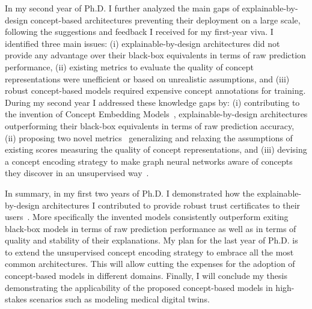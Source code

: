In my second year of Ph.D. I further analyzed the main gaps of explainable-by-design concept-based architectures preventing their deployment on a large scale, following the suggestions and feedback I received for my first-year viva. I identified three main issues: (i) explainable-by-design architectures did not provide any advantage over their black-box equivalents in terms of raw prediction performance, (ii) existing metrics to evaluate the quality of concept representations were unefficient or based on unrealistic assumptions, and (iii) robust concept-based models required expensive concept annotations for training. During my second year I addressed these knowledge gaps by: (i) contributing to the invention of Concept Embedding Models~\citep{zarlenga2022concept}, explainable-by-design architectures outperforming their black-box equivalents in terms of raw prediction accuracy, (ii) proposing two novel metrics~\citep{zarlenga2021quality,zarlenga2022concept} generalizing and relaxing the assumptions of existing scores measuring the quality of concept representations, and (iii) devising a concept encoding strategy to make graph neural networks aware of concepts they discover in an unsupervised way~\citep{magister2022encoding}.

In summary, in my first two years of Ph.D. I demonstrated how the explainable-by-design architectures I contributed to provide robust trust certificates to their users~\citep{shen2022trust}. More specifically the invented models consistently outperform exiting black-box models in terms of raw prediction performance as well as in terms of quality and stability of their explanations. My plan for the last year of Ph.D. is to extend the unsupervised concept encoding strategy to embrace all the most common architectures. This will allow cutting the expenses for the adoption of concept-based models in different domains. Finally, I will conclude my thesis demonstrating the applicability of  the proposed concept-based models in high-stakes scenarios such as modeling medical digital twins.
